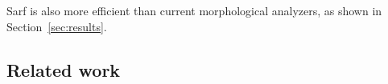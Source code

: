 \documentclass[11pt]{article}
\begin{document}
Sarf is also more efficient than current morphological analyzers, 
as shown in Section~\ref{sec:results}.






\subsection{Related work }
\label{sec:related}
\end{document}
